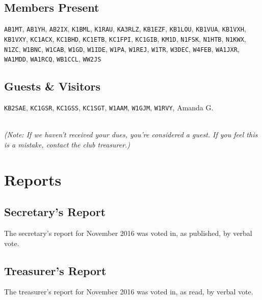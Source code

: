 \documentclass[10pt,letterpaper]{article}
\begin{document}
\subsection{Members Present}

\texttt{AB1MT},
\texttt{AB1YH},
\texttt{AB2IX},
\texttt{K1BML},
\texttt{K1RAU},
\texttt{KA3RLZ},
\texttt{KB1EZF},
\texttt{KB1LOU},
\texttt{KB1VUA},
\texttt{KB1VXH},
\texttt{KB1VXY},
\texttt{KC1ACX},
\texttt{KC1BHD},
\texttt{KC1ETB},
\texttt{KC1FPI},
\texttt{KC1GIB},
\texttt{KM1D},
\texttt{N1FSK},
\texttt{N1HTB},
\texttt{N1KWX},
\texttt{N1ZC},
\texttt{W1BNC},
\texttt{W1CAB},
\texttt{W1GD},
\texttt{W1IDE},
\texttt{W1PA},
\texttt{W1REJ},
\texttt{W1TR},
\texttt{W3DEC},
\texttt{W4FEB},
\texttt{WA1JXR},
\texttt{WA1MDD},
\texttt{WA1RCQ},
\texttt{WB1CCL},
\texttt{WW2JS}

\subsection{Guests \& Visitors}
\texttt{KB2SAE},
\texttt{KC1GSR},
\texttt{KC1GSS},
\texttt{KC1SGT},
\texttt{W1AAM},
\texttt{W1GJM},
\texttt{W1RVY},
Amanda G.


\noindent\\
\emph{(Note: If we haven't received your dues, you're considered a guest. If you feel this is a mistake, contact the club treasurer.)}

\section{Reports}

\subsection{Secretary's Report}
The secretary's report for November 2016 was voted in, as published, by verbal vote.

\newpage
\subsection{Treasurer's Report}
The treasurer's report for November 2016 was voted in, as read, by verbal vote.
\end{document}
